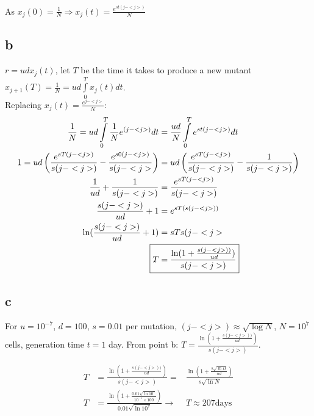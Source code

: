 As $x_j(0) = \frac{1}{N} \Rightarrow \boxed{x_j(t) = \frac{e^{st(j-<j>)}}{N}} $

\subsection{b}

$r = udx_j(t)$, let $T$ be the time it takes to produce a new mutant $x_{j+1}(T) = \frac{1}{N} = ud\int\limits_{0}^{T} x_j(t)dt$.\\
Replacing $x_j(t) = \frac{e^{j-<j>}}{N} : $
\begin{align*}
\frac{1}{N} = ud\int\limits_{0}^{T} \frac{1}{N}e^{(j-<j>)}dt &= \frac{ud}{N}\int\limits_{0}^{T} e^{st(j-<j>)}dt\\
1 = ud\left(\frac{e^{sT(j-<j>)}}{s(j-<j>)}-\frac{e^{s0(j-<j>)}}{s(j-<j>}\right) &= ud\left( \frac{e^{sT(j-<j>)}}{s(j-<j>)} - \frac{1}{s(j-<j>)}\right)\\
 \frac{1}{ud}+\frac{1}{s(j-<j>)} &= \frac{e^{sT(j-<j>)}}{s(j-<j>)}\\
 \frac{s(j-<j>)}{ud}+1 &= e^{sT(s(j-<j>))}\\
 \ln (\frac{s(j-<j>)}{ud}+1) &= sTs(j-<j>\\
 \Aboxed{T &= \frac{\ln(1+\frac{s(j-<j>))}{ud})}{s(j-<j>)}}
\end{align*}

\subsection{c}

For $u=10^{-7}$, $d=100$, $s=0.01$ per mutation, $(j-<j>) \approx \sqrt{\log N}$, $N=10^{7}$ cells, generation time $t=1$ day.
From point b: $\boxed{T = \frac{\ln(1+\frac{s(j-<j>))}{ud})}{s(j-<j>)}}$.

\begin{align*}
T &= \frac{\ln(1+\frac{s(j-<j>))}{ud})}{s(j-<j>)} =& \frac{\ln (1+\frac{s\sqrt{\ln H}}{nd})}{s\sqrt{\ln N}} \\
T &= \frac{\ln (1+\frac{0.01\sqrt{\ln 10^7}}{10^{-7}\times 100})}{0.01\sqrt{\ln 10^7}} \rightarrow & T \approx 207 \text{days}
\end{align*}


